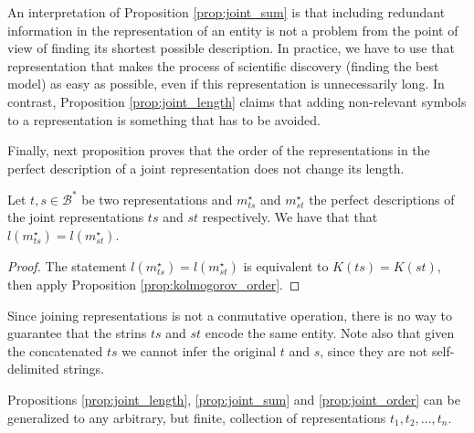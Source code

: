{\color{red} An interpretation of Proposition \ref{prop:joint_sum} is that including redundant information in the representation of an entity is not a problem from the point of view of finding its shortest possible description. In practice, we have to use that representation that makes the process of scientific discovery (finding the best model) as easy as possible, even if this representation is unnecessarily long. In contrast, Proposition \ref{prop:joint_length} claims that adding non-relevant symbols to a representation is something that has to be avoided.}

Finally, next proposition proves that the order of the representations in the perfect description of a joint representation does not change its length.

\begin{proposition}
\label{prop:joint_order}
Let $t,s \in \mathcal{B}^\ast$ be two representations and $m_{ts}^{\star}$ and $m_{st}^{\star}$ the perfect descriptions of the joint representations $ts$ and $st$ respectively. We have that that $l \left( m_{ts}^{\star} \right) = l \left( m_{st}^{\star} \right)$.
\end{proposition}
\begin{proof}
The statement $l \left( m_{ts}^{\star} \right) = l \left( m_{st}^{\star} \right)$ is equivalent to $K(ts) = K(st)$, then apply Proposition \ref{prop:kolmogorov_order}.
\end{proof}

Since joining representations is not a conmutative operation, there is no way to guarantee that the strins $ts$ and $st$ encode the same entity. Note also that given the concatenated $ts$ we cannot infer the original $t$ and $s$, since they are not self-delimited strings.

Propositions \ref{prop:joint_length}, \ref{prop:joint_sum} and \ref{prop:joint_order} can be generalized to any arbitrary, but finite, collection of representations $t_1, t_2, \ldots, t_n$.

